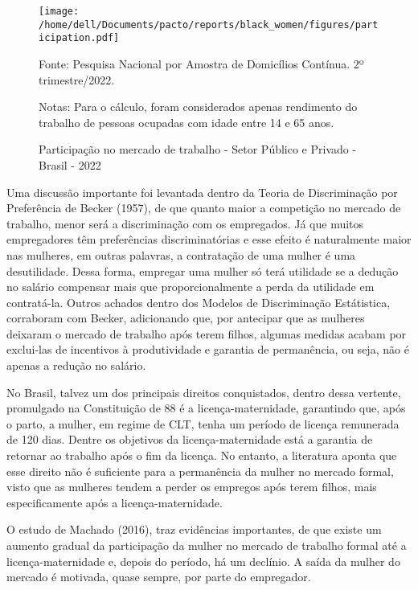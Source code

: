 \documentclass[12pt]{article}
\begin{document}
\begin{figure}[H]
    \centering
    \caption{Participação no mercado de trabalho - Setor Público e Privado - Brasil - 2022}
        \texttt{[image: /home/dell/Documents/pacto/reports/black\_women/figures/participation.pdf]}
    \label{fig:participation}
    \begin{floatnotes}
        \item[Fonte:] Pesquisa Nacional por Amostra de Domicílios Contínua. 2º trimestre/2022.
        \item[Notas:] Para o cálculo, foram considerados apenas rendimento do trabalho de pessoas ocupadas com idade entre 14 e 65 anos.
    \end{floatnotes}
\end{figure}

\par Uma discussão importante foi levantada dentro da Teoria de Discriminação por Preferência de Becker (1957), de que quanto maior a competição no mercado de trabalho, menor será a discriminação com os empregados. Já que muitos empregadores têm preferências discriminatórias e esse efeito é naturalmente maior nas mulheres, em outras palavras, a contratação de uma mulher é uma desutilidade. Dessa forma, empregar uma mulher só terá utilidade se a dedução no salário compensar mais que proporcionalmente a perda da utilidade em contratá-la. Outros achados dentro dos Modelos de Discriminação Estátistica, corraboram com Becker, adicionando que, por antecipar que as mulheres deixaram o mercado de trabalho após terem filhos, algumas medidas acabam por exclui-las de incentivos à produtividade e garantia de permanência, ou seja, não é apenas a redução no salário.

\par No Brasil, talvez um dos principais direitos conquistados, dentro dessa vertente, promulgado na Constituição de 88 é a licença-maternidade, garantindo que, após o parto, a mulher, em regime de CLT, tenha um período de licença remunerada de 120 dias. Dentre os objetivos da licença-maternidade está a garantia de retornar ao trabalho após o fim da licença. No entanto, a literatura aponta que esse direito não é suficiente para a permanência da mulher no mercado formal, visto que as mulheres tendem a perder os empregos após terem filhos, mais especificamente após a licença-maternidade. 

\par O estudo de Machado (2016), traz evidências importantes, de que existe um aumento gradual da participação da mulher no mercado de trabalho formal até a licença-maternidade e, depois do período, há um declínio. A saída da mulher do mercado é motivada, quase sempre, por parte do empregador. 
\end{document}
